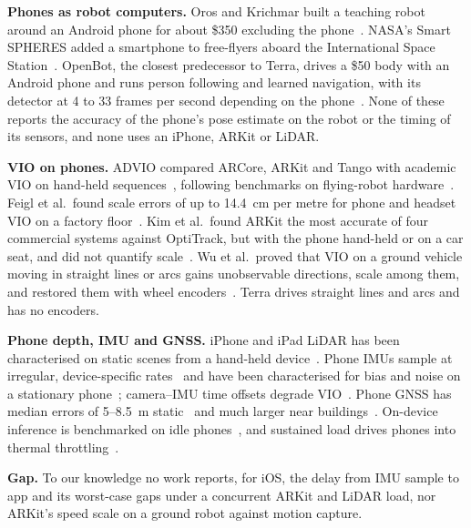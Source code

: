 \documentclass[conference]{IEEEtran}
\begin{document}
\textbf{Phones as robot computers.}
Oros and Krichmar built a teaching robot around an Android phone for about \$350 excluding the phone~\cite{oros2013smartphone}.
NASA's Smart SPHERES added a smartphone to free-flyers aboard the International Space Station~\cite{fong2013smartspheres}.
OpenBot, the closest predecessor to Terra, drives a \$50 body with an Android phone and runs person following and learned navigation, with its detector at 4 to 33 frames per second depending on the phone~\cite{muller2021openbot}.
None of these reports the accuracy of the phone's pose estimate on the robot or the timing of its sensors, and none uses an iPhone, ARKit or LiDAR.

\textbf{VIO on phones.}
ADVIO compared ARCore, ARKit and Tango with academic VIO on hand-held sequences~\cite{cortes2018advio}, following benchmarks on flying-robot hardware~\cite{delmerico2018benchmark}.
Feigl et al.\ found scale errors of up to 14.4~cm per metre for phone and headset VIO on a factory floor~\cite{feigl2020localization}.
Kim et al.\ found ARKit the most accurate of four commercial systems against OptiTrack, but with the phone hand-held or on a car seat, and did not quantify scale~\cite{kim2022benchmark}.
Wu et al.\ proved that VIO on a ground vehicle moving in straight lines or arcs gains unobservable directions, scale among them, and restored them with wheel encoders~\cite{wu2017vinswheels}.
Terra drives straight lines and arcs and has no encoders.

\textbf{Phone depth, IMU and GNSS.}
iPhone and iPad LiDAR has been characterised on static scenes from a hand-held device~\cite{luetzenburg2021iphone,vogt2021ipad,baruch2021arkitscenes}.
Phone IMUs sample at irregular, device-specific rates~\cite{stisen2015smart} and have been characterised for bias and noise on a stationary phone~\cite{kos2016inertial}; camera--IMU time offsets degrade VIO~\cite{li2014temporal}.
Phone GNSS has median errors of 5--8.5~m static~\cite{zandbergen2011agps} and much larger near buildings~\cite{merry2019smartphone}.
On-device inference is benchmarked on idle phones~\cite{ignatov2019aibenchmark,reddi2022mlperfmobile}, and sustained load drives phones into thermal throttling~\cite{xiao2024llmpocket}.

\textbf{Gap.}
To our knowledge no work reports, for iOS, the delay from IMU sample to app and its worst-case gaps under a concurrent ARKit and LiDAR load, nor ARKit's speed scale on a ground robot against motion capture.

\end{document}
